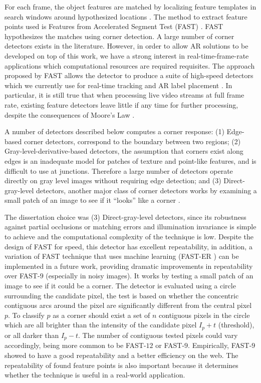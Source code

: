 For each frame, the object features are matched by localizing feature templates in search windows around hypothesized locations \cite{Lepetit2005}. The method to extract feature points used is Features from Accelerated Segment Test (FAST) \cite{Rosten2010,RostenFaster2010}. FAST hypothesizes the matches using corner detection. A large number of corner detectors exists in the literature. However, in order to allow AR solutions to be developed on top of this work, we have a strong interest in real-time-frame-rate applications which computational resources are required requisites. The approach proposed by FAST allows the detector to produce a suite of high-speed detectors which we currently use for real-time tracking and AR label placement \cite{Calonder2010}. In particular, it is still true that when processing live video streams at full frame rate, existing feature detectors leave little if any time for further processing, despite the consequences of Moore's Law \cite{Rosten2010}.

A number of detectors described below computes a corner response: (1) Edge-based corner detectors, correspond to the boundary between two regions; (2) Gray-level-derivative-based detectors, the assumption that corners exist along edges is an inadequate model for patches of texture and point-like features, and is difficult to use at junctions. Therefore a large number of detectors operate directly on gray level images without requiring edge detection; and (3) Direct-gray-level detectors, another major class of corner detectors works by examining a small patch of an image to see if it ``looks'' like a corner \cite{Rosten2010}.

The dissertation choice was (3) Direct-gray-level detectors, since its robustness against partial occlusions or matching errors and illumination invariance is simple to achieve and the computational complexity of the technique is low.
Despite the design of FAST for speed, this detector has excellent repeatability, in addition, a variation of FAST technique that uses machine learning (FAST-ER \cite{RostenFaster2010}) can be implemented in a future work, providing dramatic improvements in repeatability over FAST-$9$ (especially in noisy images). It works by testing a small patch of an image to see if it could be a corner. The detector is evaluated using a circle surrounding the candidate pixel, the test is based on whether the concentric contiguous arcs around the pixel are significantly different from the central pixel $p$. To classify $p$ as a corner should exist a set of $n$ contiguous pixels in the circle which are all brighter than the intensity of the candidate pixel $I_{p} + t$ (threshold), or all darker than $I_{p} - t$. The number of contiguous tested pixels could vary accordingly, being more common to be FAST-$12$ or FAST-$9$. Empirically, FAST-$9$ showed to have a good repeatability and a better efficiency on the web. The repeatability of found feature points is also important because it determines whether the technique is useful in a real-world application.

